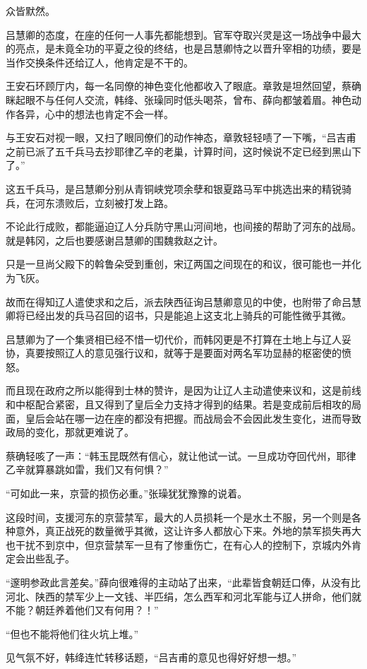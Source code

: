 众皆默然。

吕慧卿的态度，在座的任何一人事先都能想到。官军夺取兴灵是这一场战争中最大的亮点，是未竟全功的平夏之役的终结，也是吕慧卿恃之以晋升宰相的功绩，要是当作交换条件还给辽人，他肯定是不干的。

王安石环顾厅内，每一名同僚的神色变化他都收入了眼底。章敦是坦然回望，蔡确眯起眼不与任何人交流，韩绛、张璪同时低头喝茶，曾布、薛向都皱着眉。神色动作各异，心中的想法也肯定不会一样。

与王安石对视一眼，又扫了眼同僚们的动作神态，章敦轻轻啧了一下嘴，“吕吉甫之前已派了五千兵马去抄耶律乙辛的老巢，计算时间，这时候说不定已经到黑山下了。”

这五千兵马，是吕慧卿分别从青铜峡党项余孽和银夏路马军中挑选出来的精锐骑兵，在河东溃败后，立刻被打发上路。

不论此行成败，都能逼迫辽人分兵防守黑山河间地，也间接的帮助了河东的战局。就是韩冈，之后也要感谢吕慧卿的围魏救赵之计。

只是一旦尚父殿下的斡鲁朵受到重创，宋辽两国之间现在的和议，很可能也一并化为飞灰。

故而在得知辽人遣使求和之后，派去陕西征询吕慧卿意见的中使，也附带了命吕慧卿将已经出发的兵马召回的诏书，只是能追上这支北上骑兵的可能性微乎其微。

吕慧卿为了一个集贤相已经不惜一切代价，而韩冈更是不打算在土地上与辽人妥协，真要按照辽人的意见强行议和，就等于是要面对两名军功显赫的枢密使的愤怒。

而且现在政府之所以能得到士林的赞许，是因为让辽人主动遣使来议和，这是前线和中枢配合紧密，且又得到了皇后全力支持才得到的结果。若是变成前后相攻的局面，皇后会站在哪一边在座的都没有把握。而战局会不会因此发生变化，进而导致政局的变化，那就更难说了。

蔡确轻咳了一声：“韩玉昆既然有信心，就让他试一试。一旦成功夺回代州，耶律乙辛就算暴跳如雷，我们又有何惧？”

“可如此一来，京营的损伤必重。”张璪犹犹豫豫的说着。

这段时间，支援河东的京营禁军，最大的人员损耗一个是水土不服，另一个则是各种意外，真正战死的数量微乎其微，这让许多人都放心下来。外地的禁军损失再大也干扰不到京中，但京营禁军一旦有了惨重伤亡，在有心人的控制下，京城内外肯定会出些乱子。

“邃明参政此言差矣。”薛向很难得的主动站了出来，“此辈皆食朝廷口俸，从没有比河北、陕西的禁军少上一文钱、半匹绢，怎么西军和河北军能与辽人拼命，他们就不能？朝廷养着他们又有何用？！”

“但也不能将他们往火坑上堆。”

见气氛不好，韩绛连忙转移话题，“吕吉甫的意见也得好好想一想。”

